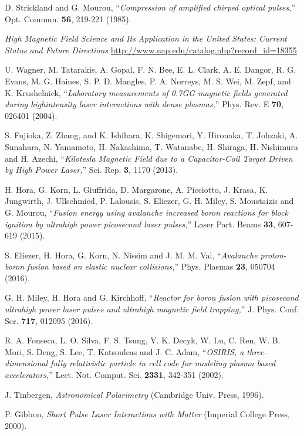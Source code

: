 \documentclass[%
aps,
preprint,
showpacs,
preprintnumbers,
 amsmath,
 amssymb,
 prl,
]{revtex4-1}
\begin{document}
\begin{thebibliography}{9}
 D. Strickland and G. Mourou, ``\emph{Compression of amplified chirped optical pulses,}'' Opt. Commun. \textbf{56}, 219-221 (1985).

 \emph{High Magnetic Field Science and Its Application in the United States: Current Status and Future Directions} \url{http://www.nap.edu/catalog.php?record_id=18355}

 U. Wagner, M. Tatarakis, A. Gopal, F. N. Bee, E. L. Clark, A. E. Dangor, R. G. Evans, M. G. Haines, S. P. D. Mangles, P. A. Norreys, M. S. Wei, M. Zepf, and K. Krushelnick, ``\emph{Laboratory measurements of 0.7GG magnetic fields generated during highintensity laser interactions with dense plasmas,}'' Phys. Rev. E \textbf{70}, 026401 (2004).

 S. Fujioka, Z. Zhang, and K. Ishihara, K. Shigemori, Y. Hironaka, T. Johzaki, A. Sunahara, N. Yamamoto, H. Nakashima, T. Watanabe, H. Shiraga, H. Nishimura and H. Azechi, ``\emph{Kilotesla Magnetic Field due to a Capacitor-Coil Target Driven by High Power Laser,}'' Sci. Rep. \textbf{3}, 1170 (2013).

 H. Hora, G. Korn, L. Giuffrida, D. Margarone, A. Picciotto, J. Krasa, K. Jungwirth, J. Ullschmied, P. Lalousis, S. Eliezer, G. H. Miley, S. Moustaizis and G. Mourou, ``\emph{Fusion energy using avalanche increased boron reactions for block ignition by ultrahigh power picosecond laser pulses,}'' Laser Part. Beams \textbf{33}, 607-619 (2015).

 S. Eliezer, H. Hora, G. Korn, N. Nissim and J. M. M. Val, ``\emph{Avalanche proton-boron fusion based on elastic nuclear collisions,}'' Phys. Plasmas \textbf{23}, 050704 (2016).

 G. H. Miley, H. Hora and G. Kirchhoff, ``\emph{Reactor for boron fusion with picosecond ultrahigh power laser pulses and ultrahigh magnetic field trapping,}'' J. Phys. Conf. Ser. \textbf{717}, 012095 (2016).

 R. A. Fonseca, L. O. Silva, F. S. Tsung, V. K. Decyk, W. Lu, C. Ren, W. B. Mori, S. Deng, S. Lee, T. Katsouleas and J. C. Adam, ``\emph{OSIRIS, a three-dimensional fully relativistic particle in cell code for modeling plasma based accelerators,}''  Lect. Not. Comput. Sci. \textbf{2331}, 342-351 (2002).

  J. Tinbergen, \emph{Astronomical Polarimetry} (Cambridge Univ. Press, 1996).

 P. Gibbon, \emph{Short Pulse Laser Interactions with Matter} (Imperial College Press, 2000).


\end{thebibliography}
\end{document}
